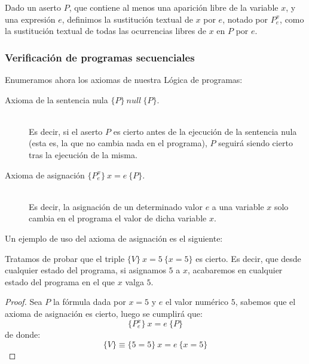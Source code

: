 \begin{definicion}
    Dado un aserto $P$, que contiene al menos una aparición libre de la variable $x$, y una expresión $e$, definimos la sustitución textual de $x$ por $e$, notado por $P_e^x$, como la sustitución textual de todas las ocurrencias libres de $x$ en $P$ por $e$.
\end{definicion}

\subsubsection{Verificación de programas secuenciales}
Enumeramos ahora los axiomas de nuestra Lógica de programas:
\begin{description}
    \item [Axioma de la sentencia nula $\{P\}\ null\ \{P\}$.]~\\
        Es decir, si el aserto $P$ es cierto antes de la ejecución de la sentencia nula (esta es, la que no cambia nada en el programa), $P$ seguirá siendo cierto tras la ejecución de la misma.
    \item [Axioma de asignación $\{P_e^x\}\ x=e\ \{P\}$.]~\\
        Es decir, la asignación de un determinado valor $e$ a una variable $x$ solo cambia en el programa el valor de dicha variable $x$.
\end{description}

\begin{ejemplo}
    Un ejemplo de uso del axioma de asignación es el siguiente:

    Tratamos de probar que el triple $\{V\}\ x=5\ \{x=5\}$ es cierto. Es decir, que desde cualquier estado del programa, si asignamos $5$ a $x$, acabaremos en cualquier estado del programa en el que $x$ valga $5$.
    \begin{proof}
        Sea $P$ la fórmula dada por $x=5$ y $e$ el valor numérico $5$, sabemos que el axioma de asignación es cierto, luego se cumplirá que:
        \begin{equation*}
            \{P_e^x\}\ x=e\ \{P\}
        \end{equation*}
        de donde:
        \begin{equation*}
            \{V\} \equiv \{5=5\}\ x=e\ \{x=5\}
        \end{equation*}
        
    \end{proof}
\end{ejemplo}

